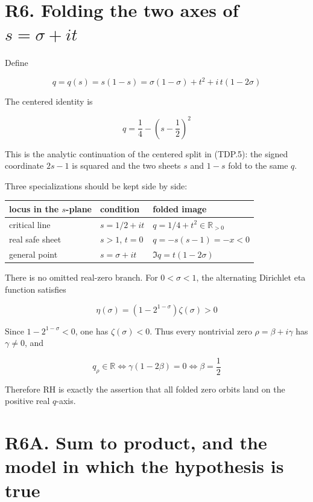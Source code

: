 \documentclass[
  11pt,
]{book}
\begin{document}
\section{\texorpdfstring{R6. Folding the two axes of
\(s=\sigma+it\)}{R6. Folding the two axes of s=\textbackslash sigma+it}}\label{r6.-folding-the-two-axes-of-ssigmait}

Define

\[
q=q(s)=s(1-s)
=\sigma(1-\sigma)+t^2+i\,t(1-2\sigma)
\tag{6.1}
\]

The centered identity is

\[
\boxed{q=\frac14-\left(s-\frac12\right)^2}
\tag{6.2}
\]

This is the analytic continuation of the centered split in (TDP.5): the
signed coordinate \(2s-1\) is squared and the two sheets \(s\) and
\(1-s\) fold to the same \(q\).

Three specializations should be kept side by side:

\begin{longtable}[]{@{}lll@{}}
\toprule\noalign{}
locus in the \(s\)-plane & condition & folded image \\
\midrule\noalign{}
\endhead
\bottomrule\noalign{}
\endlastfoot
critical line & \(s=1/2+it\) & \(q=1/4+t^2\in\mathbb R_{>0}\) \\
real safe sheet & \(s>1\), \(t=0\) & \(q=-s(s-1)=-x<0\) \\
general point & \(s=\sigma+it\) & \(\Im q=t(1-2\sigma)\) \\
\end{longtable}

There is no omitted real-zero branch. For \(0<\sigma<1\), the
alternating Dirichlet eta function satisfies

\[
\eta(\sigma)=(1-2^{1-\sigma})\zeta(\sigma)>0
\tag{6.3}
\]

Since \(1-2^{1-\sigma}<0\), one has \(\zeta(\sigma)<0\). Thus every
nontrivial zero \(\rho=\beta+i\gamma\) has \(\gamma\ne0\), and

\[
q_\rho\in\mathbb R
\iff \gamma(1-2\beta)=0
\iff \beta=\frac12
\tag{6.4}
\]

Therefore RH is exactly the assertion that all folded zero orbits land
on the positive real \(q\)-axis.

\section{R6A. Sum to product, and the model in which the hypothesis is
true}\label{r6a.-sum-to-product-and-the-model-in-which-the-hypothesis-is-true}
\end{document}
